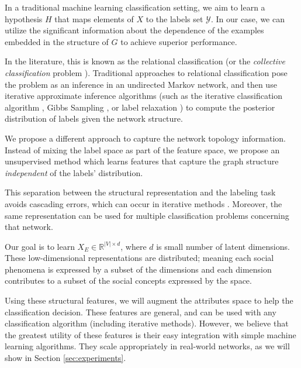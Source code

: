 \documentclass{sig-alternate}
\begin{document}
In a traditional machine learning classification setting, we aim to learn a hypothesis $H$ that maps elements of $X$ to the labels set $\mathcal{Y}$.
In our case, we can utilize the significant information about the dependence of the examples embedded in the structure of $G$ to achieve superior performance.

In the literature, this is known as the relational classification (or the \emph{collective classification} problem \cite{sen2008collective}).
Traditional approaches to relational classification pose the problem as an inference in an undirected Markov network, and then use iterative approximate inference algorithms (such as the iterative classification algorithm \cite{neville2000iterative}, Gibbs Sampling \cite{geman1984stochastic}, or label relaxation \cite{hummel1983foundations}) to compute the posterior distribution of labels given the network structure.

We propose a different approach to capture the network topology information.
Instead of mixing the label space as part of the feature space, we propose an unsupervised method which learns features that capture the graph structure \emph{independent} of the labels' distribution.

This separation between the structural representation and the labeling task avoids cascading errors, which can occur in iterative methods \cite{neville2008bias}.
Moreover, the same representation can be used for multiple classification problems concerning that network.

Our goal is to learn $X_E \in \mathbb{R}^{|V|\times d}$, where $d$ is small number of latent dimensions.
These low-dimensional representations are distributed; meaning each social phenomena is expressed by a subset of the dimensions and each dimension contributes to a subset of the social concepts expressed by the space.

Using these structural features, we will augment the attributes space to help the classification decision.  
These features are general, and can be used with any classification algorithm (including iterative methods).  
However, we believe that the greatest utility of these features is their easy integration with simple machine learning algorithms. They scale appropriately in real-world networks, as we will show in Section \ref{sec:experiments}.
\end{document}
